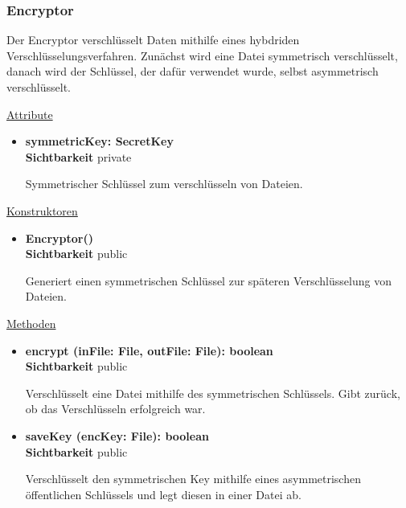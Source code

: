 \subsubsection{Encryptor} \label{app:klasse:Encryptor}
Der Encryptor verschlüsselt Daten mithilfe eines hybdriden Verschlüsselungsverfahren. Zunächst wird eine Datei symmetrisch verschlüsselt, danach wird der Schlüssel, der dafür verwendet wurde, selbst asymmetrisch verschlüsselt. \newline

\underline{Attribute}
\begin{itemize}
\itemsep0pt
\item \textbf{symmetricKey: SecretKey} \hfill\\ 
\textbf{Sichtbarkeit} private

Symmetrischer Schlüssel zum verschlüsseln von Dateien.
\end{itemize}

\underline{Konstruktoren}
\begin{itemize}
\itemsep0pt
\item \textbf{Encryptor()} \hfill\\
\textbf{Sichtbarkeit} public

Generiert einen symmetrischen Schlüssel zur späteren Verschlüsselung von Dateien.
\end{itemize}

\underline{Methoden}
\begin{itemize}
\itemsep0pt
\item \textbf{encrypt (inFile: File, outFile: File): boolean}\hfill\\
\textbf{Sichtbarkeit} public

Verschlüsselt eine Datei mithilfe des symmetrischen Schlüssels. Gibt zurück, ob das Verschlüsseln erfolgreich war.

\item \textbf{saveKey (encKey: File): boolean}\hfill\\
\textbf{Sichtbarkeit} public

Verschlüsselt den symmetrischen Key mithilfe eines asymmetrischen öffentlichen Schlüssels und legt diesen in einer Datei ab.

\end{itemize}